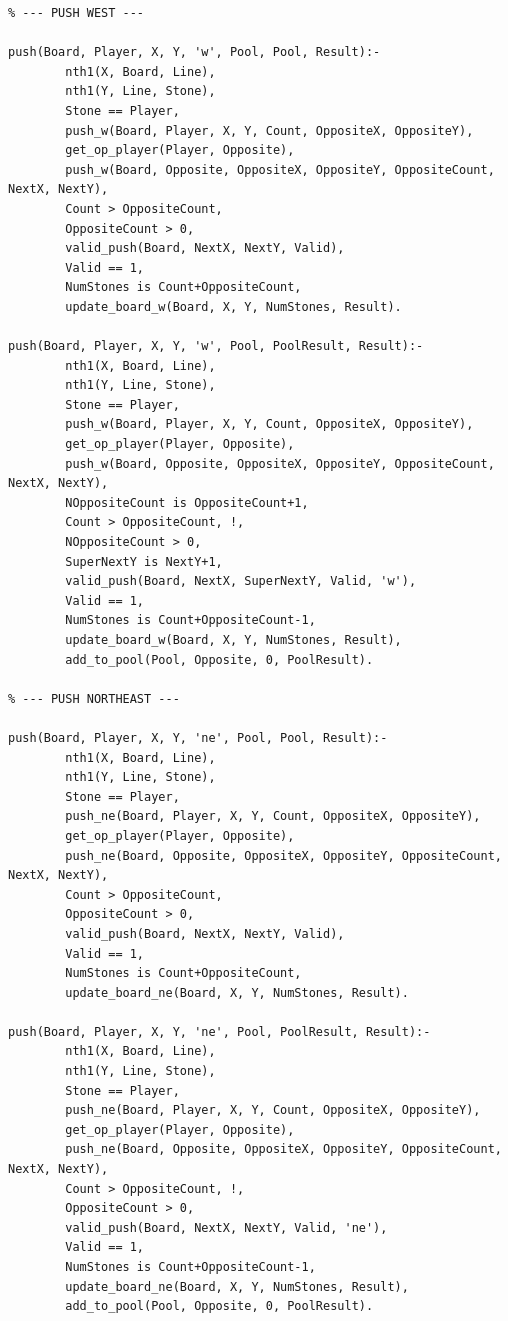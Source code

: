 \documentclass[a4paper]{article}
\begin{document}
\begin{lstlisting}
% --- PUSH WEST ---

push(Board, Player, X, Y, 'w', Pool, Pool, Result):- 
        nth1(X, Board, Line),
        nth1(Y, Line, Stone),
        Stone == Player,
        push_w(Board, Player, X, Y, Count, OppositeX, OppositeY),
        get_op_player(Player, Opposite),
        push_w(Board, Opposite, OppositeX, OppositeY, OppositeCount, NextX, NextY),
        Count > OppositeCount,
        OppositeCount > 0,
        valid_push(Board, NextX, NextY, Valid),
        Valid == 1,
        NumStones is Count+OppositeCount,
        update_board_w(Board, X, Y, NumStones, Result).

push(Board, Player, X, Y, 'w', Pool, PoolResult, Result):- 
        nth1(X, Board, Line),
        nth1(Y, Line, Stone),
        Stone == Player,
        push_w(Board, Player, X, Y, Count, OppositeX, OppositeY),
        get_op_player(Player, Opposite),
        push_w(Board, Opposite, OppositeX, OppositeY, OppositeCount, NextX, NextY),
        NOppositeCount is OppositeCount+1,
        Count > OppositeCount, !,
        NOppositeCount > 0,
        SuperNextY is NextY+1,
        valid_push(Board, NextX, SuperNextY, Valid, 'w'),
        Valid == 1,
        NumStones is Count+OppositeCount-1,
        update_board_w(Board, X, Y, NumStones, Result),
        add_to_pool(Pool, Opposite, 0, PoolResult).

% --- PUSH NORTHEAST ---

push(Board, Player, X, Y, 'ne', Pool, Pool, Result):- 
        nth1(X, Board, Line),
        nth1(Y, Line, Stone),
        Stone == Player,
        push_ne(Board, Player, X, Y, Count, OppositeX, OppositeY),
        get_op_player(Player, Opposite),
        push_ne(Board, Opposite, OppositeX, OppositeY, OppositeCount, NextX, NextY),
        Count > OppositeCount,
        OppositeCount > 0,
        valid_push(Board, NextX, NextY, Valid),
        Valid == 1,
        NumStones is Count+OppositeCount,
        update_board_ne(Board, X, Y, NumStones, Result).

push(Board, Player, X, Y, 'ne', Pool, PoolResult, Result):- 
        nth1(X, Board, Line),
        nth1(Y, Line, Stone),
        Stone == Player,
        push_ne(Board, Player, X, Y, Count, OppositeX, OppositeY),
        get_op_player(Player, Opposite),
        push_ne(Board, Opposite, OppositeX, OppositeY, OppositeCount, NextX, NextY),
        Count > OppositeCount, !,
        OppositeCount > 0,
        valid_push(Board, NextX, NextY, Valid, 'ne'),
        Valid == 1,
        NumStones is Count+OppositeCount-1,
        update_board_ne(Board, X, Y, NumStones, Result),
        add_to_pool(Pool, Opposite, 0, PoolResult).


\end{lstlisting}
\end{document}
